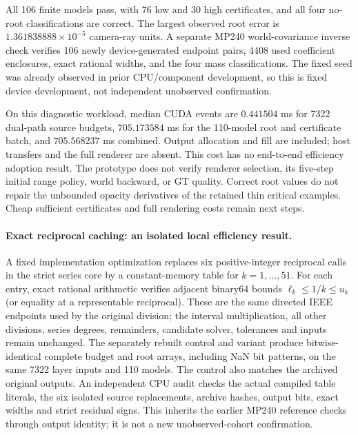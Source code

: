 \documentclass[11pt,a4paper]{article}
\begin{document}
All 106 finite models pass, with 76 low and 30 high certificates, and all
four no-root classifications are correct. The largest observed root
error is $1.361838888\times10^{-5}$ camera-ray units. A separate MP240
world-covariance inverse check verifies 106 newly device-generated
endpoint pairs, 4408 used coefficient enclosures, exact rational widths,
and the four mass classifications. The fixed seed was already observed
in prior CPU/component development, so this is fixed device development,
not independent unobserved confirmation.

On this diagnostic workload, median CUDA events are $0.441504$ ms for
7322 dual-path source budgets, $705.173584$ ms for the 110-model root
and certificate batch, and $705.568237$ ms combined. Output allocation
and fill are included; host transfers and the full renderer are absent.
This cost has no end-to-end efficiency adoption result. The prototype
does not verify renderer selection, its five-step initial range policy,
world backward, or GT quality. Correct root values do not repair the
unbounded opacity derivatives of the retained thin critical examples.
Cheap sufficient certificates and full rendering costs remain next steps.

\paragraph{Exact reciprocal caching: an isolated local efficiency result.}
A fixed implementation optimization replaces six positive-integer reciprocal
calls in the strict series core by a constant-memory table for $k=1,\ldots,51$.
For each entry, exact rational arithmetic verifies adjacent binary64 bounds
$\ell_k\leq 1/k\leq u_k$ (or equality at a representable reciprocal).
These are the same directed IEEE endpoints used by the original division;
the interval multiplication, all other divisions, series degrees, remainders,
candidate solver, tolerances and inputs remain unchanged.
The separately rebuilt control and variant produce bitwise-identical complete
budget and root arrays, including NaN bit patterns, on the same 7322 layer
inputs and 110 models. The control also matches the archived original outputs.
An independent CPU audit checks the actual compiled table literals, the six
isolated source replacements, archive hashes, output bits, exact widths and
strict residual signs. This inherits the earlier MP240 reference checks
through output identity; it is not a new unobserved-cohort confirmation.
\end{document}

